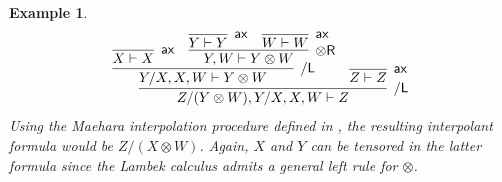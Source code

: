 \documentclass[sn-mathphys-num]{sn-jnl}%
\newcommand{\vd}{\vdash}
\newcommand{\tr}{\otimes\mathsf{R}}
\newcommand{\ax}{\mathsf{ax}}
\newcommand{\ot}{\otimes}
\newcommand{\sls}{\slash}
\newcommand{\mf}[1]{\mathsf{#1}}
\theoremstyle{thmstyleone}%
\theoremstyle{thmstyletwo}%
\newtheorem{example}[theorem]{Example}%
\theoremstyle{thmstylethree}%
\begin{document}
\begin{example}
  \begin{displaymath}
    \begin{array}{c}
      \infer[\sls\mf{L}]{Z \sls (Y \ot W) , Y \sls X , X, W \vd Z}{
      \infer[\sls\mf{L}]{Y \sls X , X , W \vd Y \ot W}{
      \infer[\ax]{X \vd X}{}
      &
      \infer[\tr]{Y , W \vd Y \ot W}{
      \infer[\ax]{Y \vd Y}{}
      &
      \infer[\ax]{W \vd W}{}
      }
      }
      &
      \infer[\ax]{Z \vd Z}{}
      }
    \end{array}
  \end{displaymath}
  Using the Maehara interpolation procedure defined in \cite{moot:categorial:2012}, the resulting interpolant formula would be ${Z \sls (X \ot W)}$. Again, $X$ and $Y$ can be tensored in the latter formula since the Lambek calculus admits a general left rule for $\ot$.
\end{example}
\end{document}
